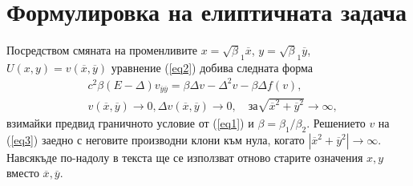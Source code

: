 \documentclass{article}
\newcommand{\rf}[1]{(\ref{#1})}
\begin{document}
\section{Формулировка на елиптичната задача}
Посредством смяната на променливите $x=\sqrt\beta_1 { \overline x}$, $y=\sqrt\beta_1 { \overline y}$, $U(x,y)= v({ \overline x},{ \overline y} )$ уравнение 
\rf{eq2} добива следната форма
 \begin{align}\label{eq3}
&c^2 \beta (E- \Delta) v_{{\overline y}{\overline y}} = \beta \Delta v - \Delta^2 v - \beta \Delta f(v), \\ 
&v(\overline x, \overline y) \rightarrow 0,  \Delta v(\overline x, \overline y) \rightarrow 0 ,  \quad \text{за}  \sqrt{\overline x^2 + \overline y^2} \rightarrow \infty, \nonumber
\end{align}
взимайки предвид граничното условие от \rf{eq1} и $\beta = \beta_1 / \beta_2$.
Решението $v$ на \rf{eq3} заедно с неговите производни клони към нула, когато $|{\overline x}^2 +{\overline y}^2|\rightarrow \infty$.
Навсякъде по-надолу в текста ще се използват отново старите означения $x,y$ вместо ${\overline x},{\overline y}$.
\end{document}
